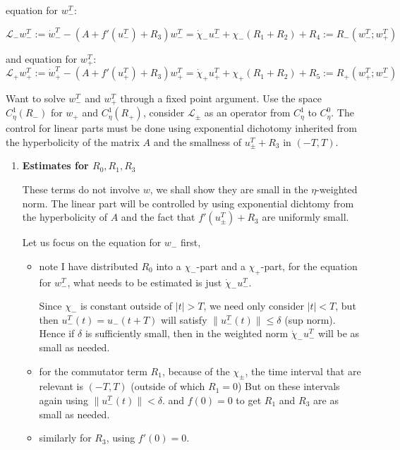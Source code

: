 \documentclass[letterpaper,11pt]{article}
\numberwithin{equation}{section}
\theoremstyle{plain}
\begin{document}
equation for $w_-^T$:

\[
\mathcal{L}_- w_-^T := \dot{w}_-^T - (A+f'(u_-^T)+R_3)w_-^T = \dot{\chi}_-u_-^T+ \chi_-(R_1+R_2)+R_4:=R_-(w_-^T;w_+^T)
\]

and equation for $w_+^T$:
\[
\mathcal{L}_+ w_+^T:=\dot{w}_+^T - (A+f'(u_+^T)+R_3)w_+^T = \dot{\chi}_+u_+^T+ \chi_+(R_1+R_2)+R_5:=R_+(w_+^T;w_-^T)
\]

Want to solve $w_-^T$ and $w_+^T$ through a fixed point argument. Use the space $C^1_\eta(R_-)$ for $w_+$ and $C^1_\eta(R_+)$, consider $\mathcal{L}_\pm$ as an operator from $C^1_\eta$ to $C^0_\eta$. The control for linear parts must be done using exponential dichotomy inherited from the hyperbolicity of the matrix $A$ and the smallness of $u_{\pm}^T+R_3$ in $(-T,T)$.
\begin{enumerate}

\item \textbf{Estimates for $R_0,R_1,R_3$}

These terms do not involve $w$, we shall show they are small in the $\eta$-weighted norm. The linear part will be controlled by using exponential dichtomy from the hyperbolicity of $A$ and the fact that $f'(u_{\pm}^T)+R_3$ are uniformly small.



Let us focus on the equation for $w_-$ first, 
\begin{itemize}

\item note I have distributed $R_0$ into a $\chi_-$-part and a $\chi_+$-part, for the equation for $w_-^T$, what needs to be estimated is just $\dot{\chi}_-u_-^T$.

Since $\chi_-$ is constant outside of $|t|>T$, we need only consider $|t|<T$, but then $u_-^T(t)=u_-(t+T)$ will satisfy $\|u_-^T(t)\| \le \delta$ (sup norm). Hence if $\delta$ is sufficiently small, then in the weighted norm $\dot{\chi}_- u_-^T$ will be as small as needed.




\item for the commutator term $R_1$, because of the $\chi_\pm$, the time interval that are relevant is $(-T,T)$ (outside of which $R_1=0$) But on these intervals again using $\|u_-^T(t)\| <\delta$. and $f(0) = 0$ to get $R_1$ and $R_3$ are as small as needed.

\item similarly for $R_3$, using $f'(0)=0$.
\end{itemize}


\end{enumerate}
\end{document}
